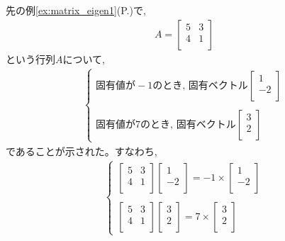 先の例\ref{ex:matrix_eigen1}(P.\pageref{ex:matrix_eigen1})で, 
\begin{eqnarray}
A=\begin{bmatrix}
5 & 3 \\
4 & 1 \\
\end{bmatrix}
\end{eqnarray}
という行列$A$について, 
\begin{eqnarray*}\begin{cases}
\text{固有値が}-1\text{のとき, 固有ベクトル}
\begin{bmatrix}
1 \\
-2 \\
\end{bmatrix}\\
\\
\text{固有値が}7\text{のとき, 固有ベクトル}
\begin{bmatrix}
3 \\
2 \\
\end{bmatrix}
\end{cases}\end{eqnarray*}
であることが示された。すなわち, 
\begin{eqnarray}\begin{cases}
\begin{bmatrix}
5 & 3 \\
4 & 1 \\
\end{bmatrix}
\begin{bmatrix}
1 \\
-2 \\
\end{bmatrix}
=-1\times\begin{bmatrix}
1 \\
-2 \\
\end{bmatrix}\\
\\
\begin{bmatrix}
5 & 3 \\
4 & 1 \\
\end{bmatrix}
\begin{bmatrix}
3 \\
2 \\
\end{bmatrix}
=7\times\begin{bmatrix}
3 \\
2 \\
\end{bmatrix}
\end{cases}\end{eqnarray}
